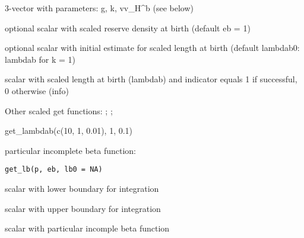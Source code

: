 \documentclass[a4paper]{book}
\begin{document}
%
\begin{Arguments}
\begin{ldescription}
\item[\code{p}] 3-vector with parameters: g, k, vv\_H\textasciicircum{}b (see below)

\item[\code{eb}] optional scalar with scaled reserve density at birth (default eb = 1)

\item[\code{lambdab0}] optional scalar with initial estimate for scaled length at birth (default lambdab0: lambdab for k = 1)
\end{ldescription}
\end{Arguments}
%
\begin{Value}
scalar with scaled length at birth (lambdab) and indicator equals 1 if successful, 0 otherwise (info)
\end{Value}
%
\begin{SeeAlso}\relax
Other scaled get functions: ;
; 
\end{SeeAlso}
%
\begin{Examples}
\begin{ExampleCode}
get_lambdab(c(10, 1, 0.01), 1, 0.1)
\end{ExampleCode}
\end{Examples}
%
\begin{Description}\relax
particular incomplete beta function:
\end{Description}
%
\begin{Usage}
\begin{verbatim}
get_lb(p, eb, lb0 = NA)
\end{verbatim}
\end{Usage}
%
\begin{Arguments}
\begin{ldescription}
\item[\code{x0}] scalar with lower boundary for integration

\item[\code{x1}] scalar with upper boundary for integration
\end{ldescription}
\end{Arguments}
%
\begin{Value}
scalar with particular incomple beta function
\end{Value}
\end{document}
